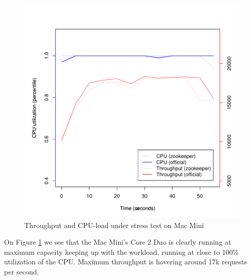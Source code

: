 \clearpage
\begin{figure}[h]
    \centering
    \includegraphics[width=1.0\textwidth]{results/throughput/singlenode/throughput_macmini}
    \caption{Throughput and CPU-load under stress test on Mac Mini}
    \label{fig:thug_mini}
\end{figure}

On Figure \ref{fig:thug_mini} we see that the Mac Mini's Core 2 Duo is clearly running at maximum capacity keeping up with the workload, running at close to 100\% utilization of the CPU. Maximum throughput is hovering around 17k requests per second. 

